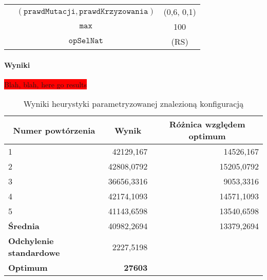 \documentclass[twoside]{iisthesis}
\newcommand{\todo}{\colorbox{red}}
\newcommand{\param}[1]{\mathtt{#1}}
\newcommand{\opName}[1]{\textproc{#1}}
\begin{document}
\begin{table}[h]
\begin{tabular}{c|c|c|}
		\multicolumn{1}{|c|}{}                                & $(\param{prawdMutacji}, \param{prawdKrzyzowania})$ & (0,6, 0,1)              \\ \cline{2-3} 
		\multicolumn{1}{|c|}{}                                & $\param{max}$                                      & 100                     \\ \cline{2-3} 
		\multicolumn{1}{|c|}{}                                & $\param{opSelNat}$                                 & \opName{natSel}(RS)                \\ \hline
		
	\end{tabular}
\end{table}

\paragraph{Wyniki}

\todo{Blah, blah, here go results}

\begin{table}[h]
	\caption{Wyniki heurystyki parametryzowanej znalezioną konfiguracją \label{tsp_init_results}}
	\begin{tabular}{|l|r|r}
		\hline
		\multicolumn{1}{|c|}{{\bf Numer powtórzenia}} & \multicolumn{1}{c|}{{\bf Wynik}} & \multicolumn{1}{c|}{{\bf Różnica względem optimum}} \\ \hline \hline
		1                                             & 42129,167                        & \multicolumn{1}{r|}{14526,167}                      \\ \hline
		2                                             & 42808,0792                       & \multicolumn{1}{r|}{15205,0792}                     \\ \hline
		3                                             & 36656,3316                       & \multicolumn{1}{r|}{9053,3316}                      \\ \hline
		4                                             & 42174,1093                       & \multicolumn{1}{r|}{14571,1093}                     \\ \hline
		5                                             & 41143,6598                       & \multicolumn{1}{r|}{13540,6598}                     \\ \hline \hline
		{\bf Średnia}                                 & 40982,2694                      & \multicolumn{1}{r|}{13379,2694}                    \\ \hline
		{\bf Odchylenie standardowe}                  & 2227,5198                        &                       \\  \hhline{==~}
		{\bf Optimum}                                 & \multicolumn{1}{r|}{{\bf 27603}} & \multicolumn{1}{l}{}                                \\ \cline{1-2}
	\end{tabular}
\end{table}
\end{document}
